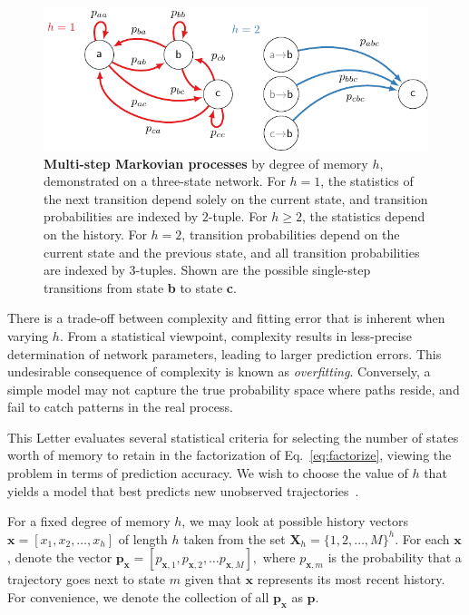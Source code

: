 \documentclass[prl,twocolumn,groupedaddress]{revtex4-1}
\newcommand{\bx}{\mathbf{x}}
\newcommand{\bp}{\mathbf{p}}
\renewcommand{\bf}[1]{\textbf{#1}}
\begin{document}
  \begin{figure}
 \includegraphics[width=\linewidth]{fig1b}
 \caption{\bf{Multi-step Markovian processes}  by degree of memory $h$, demonstrated on a three-state network. For $h=1$, the statistics of the next transition depend solely on the current state, and transition probabilities are indexed by  $2$-tuple. For $h\geq2$, the statistics depend on the history. For $h=2$, transition probabilities depend on the
 current state and the previous state, and all transition probabilities are indexed by $3$-tuples.  Shown are the possible single-step transitions from state \bf{b} to state \bf{c}.  } \label{fig:fig1}
 \end{figure}

There is a trade-off between complexity and fitting error that is inherent when varying $h$. From a statistical viewpoint, complexity results in less-precise determination of network parameters, leading to larger prediction errors. This undesirable consequence of complexity is known as \emph{overfitting}. Conversely, a simple model may not capture the true probability space where paths reside, and fail to catch patterns in the real process.

This Letter evaluates several statistical criteria for selecting the number of states worth of memory to retain in the factorization of Eq.~\ref{eq:factorize}, viewing the problem in terms of prediction accuracy. 
We wish to choose the value of $h$ that yields a model that best predicts new unobserved trajectories~\cite{claeskens2008model}. 

 For a fixed degree of memory $h$,
we may look at possible history vectors $\bx = [x_1,x_2,\ldots,x_h]$ of length $h$ taken from the set $\mathbf{X}_h = \{1,2,\ldots,M \}^h$. For each $\bx$, denote the vector $\mathbf{p}_{\bx} = [p_{\bx,1},p_{\bx,2},\ldots{p}_{\bx,M}],$ where $p_{\bx,m}$ is the probability that a trajectory goes next to state $m$ given that $\bx$ represents its most recent history. For convenience, we denote the collection of all $\bp_\bx$ as $\mathbf{p}$.  
\end{document}
